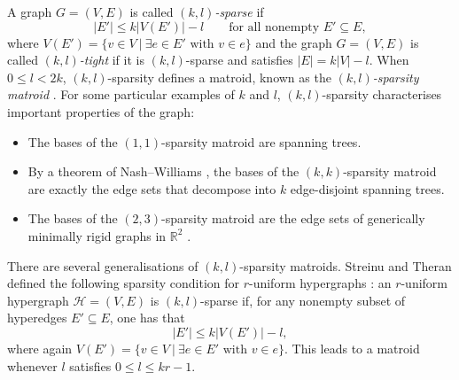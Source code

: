 \documentclass{article}
\begin{document}
A graph $G=(V,E)$ is called \emph{$(k,l)$-sparse} if
\[
|E'| \le k|V(E')| - l \qquad \text{for all nonempty } E' \subseteq E,
\]
where $V(E')=\{v \in V ~|~ \exists e\in E'\text{ with } v\in e\}$ and the graph $G=(V,E)$ is called \emph{$(k,l)$-tight} if it is $(k,l)$-sparse and satisfies $|E| = k|V| - l$. When $0\leq l < 2k$, $(k,l)$-sparsity defines a matroid, known as the \emph{$(k,l)$-sparsity matroid} \cite{LOREA1979103}. 
\noindent
For some particular examples of $k$ and $l$, $(k,l)$-sparsity characterises important properties of the graph:
\begin{itemize}
    \item The bases of the $(1,1)$-sparsity matroid are spanning trees.
    \item By a theorem of Nash--Williams \cite{Nash-Williams}, the bases of the $(k,k)$-sparsity matroid are exactly the edge sets that decompose into $k$ edge-disjoint spanning trees.
    \item The bases of the $(2,3)$-sparsity matroid are the edge sets of generically minimally rigid graphs in $\mathbb{R}^2$ \cite{Laman, Geiringer}.
\end{itemize}

There are several generalisations of $(k,l)$-sparsity matroids. Streinu and Theran defined the following sparsity condition for $r$-uniform hypergraphs \cite{STREINU20091944}: an $r$-uniform  hypergraph $\mathcal{H} =  (V, E)$ is $(k, l)$-sparse if, for any nonempty subset of hyperedges $E'\subseteq E$, one has that
\begin{equation*}
    |E'| \leq k |V(E')| - l, 
\end{equation*}
where again $V(E')=\{v \in V ~|~ \exists e\in E'\text{ with } v\in e\}$. This leads to a matroid whenever $l$ satisfies $0\leq l\leq kr -1$.

\end{document}

